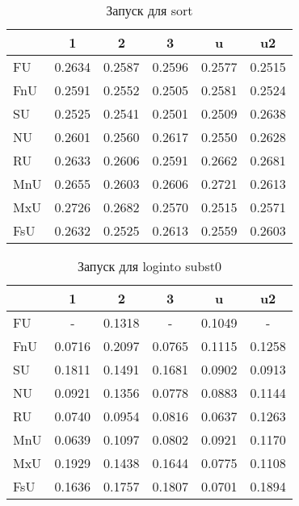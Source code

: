 \begin{table}[h!]
\center
\begin{tabular}{|l|c|c|c|c|c|}
\hline
   &     1    &    2   &       3 &    u   &   u2   \\ \hline
FU & 0.2634   & 0.2587 & 0.2596  & 0.2577 & 0.2515 \\ \hline
FnU& 0.2591   & 0.2552 & 0.2505  & 0.2581 & 0.2524 \\ \hline
SU & 0.2525   & 0.2541 & 0.2501  & 0.2509 & 0.2638 \\ \hline
NU & 0.2601   & 0.2560 & 0.2617  & 0.2550 & 0.2628 \\ \hline
RU & 0.2633   & 0.2606 & 0.2591  & 0.2662 & 0.2681 \\ \hline
MnU& 0.2655   & 0.2603 & 0.2606  & 0.2721 & 0.2613 \\ \hline
MxU& 0.2726   & 0.2682 & 0.2570  & 0.2515 & 0.2571 \\ \hline
FsU& 0.2632   & 0.2525 & 0.2613  & 0.2559 & 0.2603 \\ \hline
\end{tabular}
\caption{Запуск для sort}
\end{table}

\begin{table}[h!]
\center
\begin{tabular}{|l|c|c|c|c|c|}
\hline
   &     1    &    2   &       3 &    u   &   u2    \\ \hline
FU &    -     & 0.1318 &    -     & 0.1049 &    -   \\ \hline
FnU& 0.0716   & 0.2097 & 0.0765   & 0.1115 & 0.1258 \\ \hline
SU & 0.1811   & 0.1491 & 0.1681   & 0.0902 & 0.0913 \\ \hline
NU & 0.0921   & 0.1356 & 0.0778   & 0.0883 & 0.1144 \\ \hline
RU & 0.0740   & 0.0954 & 0.0816   & 0.0637 & 0.1263 \\ \hline
MnU& 0.0639   & 0.1097 & 0.0802   & 0.0921 & 0.1170 \\ \hline
MxU& 0.1929   & 0.1438 & 0.1644   & 0.0775 & 0.1108 \\ \hline
FsU& 0.1636   & 0.1757 & 0.1807   & 0.0701 & 0.1894 \\ \hline
\end{tabular}
\caption{Запуск для loginto subst0}
\end{table}
